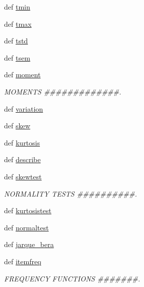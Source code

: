 \begin{DoxyCompactItemize}
\item 
def \hyperlink{namespacescipy_1_1stats_1_1stats_aa0738b7e12963beee896c5f47db4fd4b}{tmin}
\item 
def \hyperlink{namespacescipy_1_1stats_1_1stats_ab5ff5057b7e0f015c7a82a3fd300fb34}{tmax}
\item 
def \hyperlink{namespacescipy_1_1stats_1_1stats_aab06e06d1821e3622968f6c370eb7af2}{tstd}
\item 
def \hyperlink{namespacescipy_1_1stats_1_1stats_a76bb263845b2f0def598dd16a59e5bd3}{tsem}
\item 
def \hyperlink{namespacescipy_1_1stats_1_1stats_a254bd9c2c209d8ffc73376ebd700edfc}{moment}
\begin{DoxyCompactList}\small\item\em M\+O\+M\+E\+N\+T\+S \#\#\#\#\#\#\#\#\#\#\#\#\#. \end{DoxyCompactList}\item 
def \hyperlink{namespacescipy_1_1stats_1_1stats_a90ddfd8c7688498b52f36a7e56f7c996}{variation}
\item 
def \hyperlink{namespacescipy_1_1stats_1_1stats_a744ba715bda869ac6edbadbb3223c5d5}{skew}
\item 
def \hyperlink{namespacescipy_1_1stats_1_1stats_a9d516fe8283e7c7a3bee49903bbf4c64}{kurtosis}
\item 
def \hyperlink{namespacescipy_1_1stats_1_1stats_af65c740b3d78e11bf6f87843a126d837}{describe}
\item 
def \hyperlink{namespacescipy_1_1stats_1_1stats_af83023d02b569b719ce5ae04cdb5caa0}{skewtest}
\begin{DoxyCompactList}\small\item\em N\+O\+R\+M\+A\+L\+I\+T\+Y T\+E\+S\+T\+S \#\#\#\#\#\#\#\#\#\#. \end{DoxyCompactList}\item 
def \hyperlink{namespacescipy_1_1stats_1_1stats_a8a22cd6b7bca6bb0a1497c02cf69e981}{kurtosistest}
\item 
def \hyperlink{namespacescipy_1_1stats_1_1stats_ab1d985f5480e2bb7b15612b8fcbcd08a}{normaltest}
\item 
def \hyperlink{namespacescipy_1_1stats_1_1stats_a4431b91647766f533c7003141ad52efd}{jarque\+\_\+bera}
\item 
def \hyperlink{namespacescipy_1_1stats_1_1stats_a973cd5f47a121bcabbc0c181a5c50fb9}{itemfreq}
\begin{DoxyCompactList}\small\item\em F\+R\+E\+Q\+U\+E\+N\+C\+Y F\+U\+N\+C\+T\+I\+O\+N\+S \#\#\#\#\#\#\#. \end{DoxyCompactList}\item 

\end{DoxyCompactItemize}
